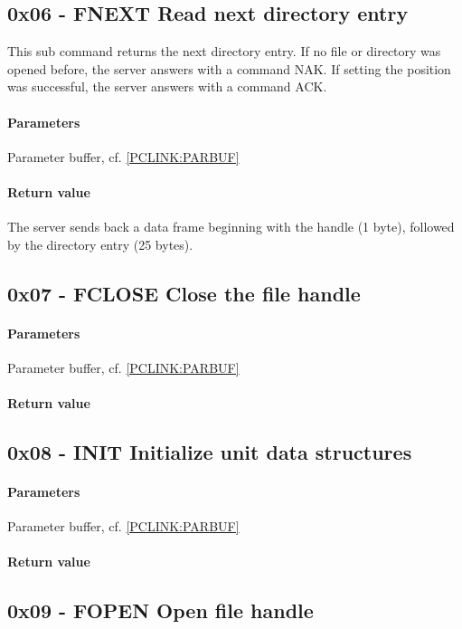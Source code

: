 \documentclass[10pt]{article}
\begin{document}
\subsection{0x06 - FNEXT Read next directory entry }
This sub command returns the next directory entry.
If no file or directory was opened before, the server answers with a command NAK.
If setting the position was successful, the server answers with a command ACK.

\paragraph{Parameters}
Parameter buffer, cf. \ref{PCLINK:PARBUF}

\paragraph{Return value}
The server sends back a data frame beginning with the handle (1 byte), followed by the directory entry (25 bytes).

\subsection{0x07 - FCLOSE Close the file handle }
\paragraph{Parameters}
Parameter buffer, cf. \ref{PCLINK:PARBUF}

\paragraph{Return value}

\subsection{0x08 - INIT Initialize unit data structures }
\paragraph{Parameters}
Parameter buffer, cf. \ref{PCLINK:PARBUF}

\paragraph{Return value}

\subsection{0x09 - FOPEN Open file handle }
\end{document}
